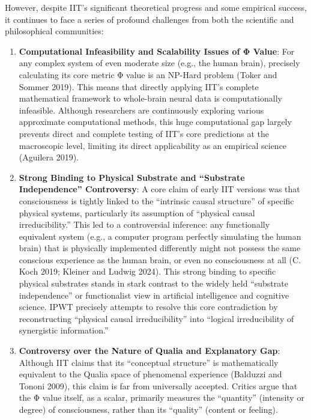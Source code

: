 \documentclass[
  a4paper]{article}
\begin{document}
However, despite IIT's significant theoretical progress and some
empirical success, it continues to face a series of profound challenges
from both the scientific and philosophical communities:

\begin{enumerate}
\def\labelenumi{\arabic{enumi}.}
\item
  \textbf{Computational Infeasibility and Scalability Issues of Φ
  Value}: For any complex system of even moderate size (e.g., the human
  brain), precisely calculating its core metric Φ value is an NP-Hard
  problem (Toker and Sommer 2019). This means that directly applying
  IIT's complete mathematical framework to whole-brain neural data is
  computationally infeasible. Although researchers are continuously
  exploring various approximate computational methods, this huge
  computational gap largely prevents direct and complete testing of
  IIT's core predictions at the macroscopic level, limiting its direct
  applicability as an empirical science (Aguilera 2019).
\item
  \textbf{Strong Binding to Physical Substrate and ``Substrate
  Independence'' Controversy}: A core claim of early IIT versions was
  that consciousness is tightly linked to the ``intrinsic causal
  structure'' of specific physical systems, particularly its assumption
  of ``physical causal irreducibility.'' This led to a controversial
  inference: any functionally equivalent system (e.g., a computer
  program perfectly simulating the human brain) that is physically
  implemented differently might not possess the same conscious
  experience as the human brain, or even no consciousness at all (C.
  Koch 2019; Kleiner and Ludwig 2024). This strong binding to specific
  physical substrates stands in stark contrast to the widely held
  ``substrate independence'' or functionalist view in artificial
  intelligence and cognitive science. IPWT precisely attempts to resolve
  this core contradiction by reconstructing ``physical causal
  irreducibility'' into ``logical irreducibility of synergistic
  information.''
\item
  \textbf{Controversy over the Nature of Qualia and Explanatory Gap}:
  Although IIT claims that its ``conceptual structure'' is
  mathematically equivalent to the Qualia space of phenomenal experience
  (Balduzzi and Tononi 2009), this claim is far from universally
  accepted. Critics argue that the Φ value itself, as a scalar,
  primarily measures the ``quantity'' (intensity or degree) of
  consciousness, rather than its ``quality'' (content or feeling).

\end{enumerate}
\end{document}
